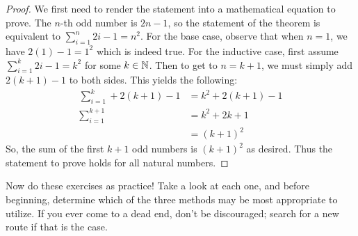\vspace{-4mm}
\begin{proof}
    We first need to render the statement into a mathematical equation to prove. The $n$-th odd number is $2n-1$, so the statement of the theorem is equivalent to $\sum_{i=1}^n 2i-1 = n^2$. For the base case, observe that when $n=1$, we have $2(1)-1 = 1^2$ which is indeed true. For the inductive case, first assume $\sum_{i=1}^k 2i-1 = k^2$ for some $k\in\mathbb{N}$. Then to get to $n=k+1$, we must simply add $2(k+1)-1$ to both sides. This yields the following:
    \begin{align*}
        \sum_{i=1}^{k} + 2(k+1) - 1 &= k^2 + 2(k+1) - 1 \\
        \sum_{i=1}^{k+1} &= k^2 + 2k + 1 \\
        &= (k+1)^2
    \end{align*}
    So, the sum of the first $k+1$ odd numbers is $(k+1)^2$ as desired. Thus the statement to prove holds for all natural numbers. 
\end{proof}

Now do these exercises as practice! Take a look at each one, and before beginning, determine which of the three methods may be most appropriate to utilize. If you ever come to a dead end, don't be discouraged; search for a new route if that is the case.

